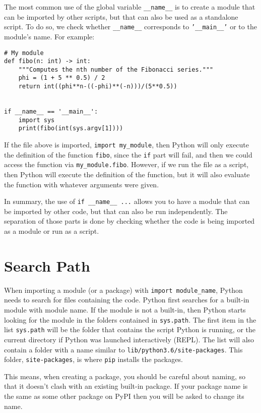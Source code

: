 \documentclass[12pt, a4paper]{article}
\begin{document}
The most common use of the global variable \texttt{\_\_name\_\_} is to create a module that can be imported by other scripts, but that can also be used as a standalone script.
To do so, we check whether \texttt{\_\_name\_\_} corresponds to \texttt{'\_\_main\_\_'} or to the module's name.
For example:
\lstset{language=jupyter-python,label= ,caption= ,captionpos=b,numbers=none}
\begin{lstlisting}
# My module
def fibo(n: int) -> int:
    """Computes the nth number of the Fibonacci series."""
    phi = (1 + 5 ** 0.5) / 2
    return int((phi**n-((-phi)**(-n)))/(5**0.5))


if __name__ == '__main__':
    import sys
    print(fibo(int(sys.argv[1])))
\end{lstlisting}
If the file above is imported, \texttt{import my\_module}, then Python will only execute the definition of the function \texttt{fibo}, since the \texttt{if} part will fail, and then we could access the function via \texttt{my\_module.fibo}.
However, if we run the file as a script, then Python will execute the definition of the function, but it will also evaluate the function with whatever arguments were given.

In summary, the use of \texttt{if \_\_name\_\_ ...} allows you to have a module that can be imported by other code, but that can also be run independently. The separation of those parts is done by checking whether the code is being imported as a module or run as a script.
\section*{Search Path}
\label{sec:org461b0a6}
When importing a module (or a package) with \texttt{import module\_name}, Python needs to search for files containing the code.
Python first searches for a built-in module with module name.
If the module is not a built-in, then Python starts looking for the module in the folders contained in \texttt{sys.path}.
The first item in the list \texttt{sys.path} will be the folder that contains the script Python is running, or the current directory if Python was launched interactively (REPL).
The list will also contain a folder with a name similar to \texttt{lib/python3.6/site-packages}. This folder, \texttt{site-packages}, is where \texttt{pip} installs the packages.

This means, when creating a package, you should be careful about naming, so that it doesn't clash with an existing built-in package.
If your package name is the same as some other package on PyPI then you will be asked to change its name.
\end{document}
